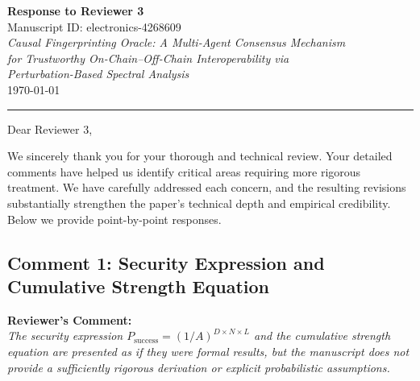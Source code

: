 \documentclass[11pt,a4paper]{article}
\newcommand{\reviewercomment}[1]{%
  \vspace{6pt}\noindent\textbf{\textcolor{reviewercolor}{Reviewer's Comment:}}\\
  \textcolor{reviewercolor}{\itshape #1}\vspace{4pt}}
\begin{document}
\begin{center}
{\LARGE\bfseries Response to Reviewer 3}\\[12pt]
{\large Manuscript ID: electronics-4268609}\\[6pt]
{\large\itshape Causal Fingerprinting Oracle: A Multi-Agent Consensus Mechanism\\
for Trustworthy On-Chain--Off-Chain Interoperability via\\
Perturbation-Based Spectral Analysis}\\[12pt]
\today
\end{center}

\noindent\rule{\textwidth}{0.4pt}

\vspace{8pt}
\noindent Dear Reviewer 3,

\vspace{4pt}
\noindent We sincerely thank you for your thorough and technical review. Your detailed comments have helped us identify critical areas requiring more rigorous treatment. We have carefully addressed each concern, and the resulting revisions substantially strengthen the paper's technical depth and empirical credibility. Below we provide point-by-point responses.

\vspace{12pt}

\subsection*{Comment 1: Security Expression and Cumulative Strength Equation}

\reviewercomment{The security expression $P_{\text{success}} = (1/A)^{D \times N \times L}$ and the cumulative strength equation are presented as if they were formal results, but the manuscript does not provide a sufficiently rigorous derivation or explicit probabilistic assumptions.}
\end{document}
